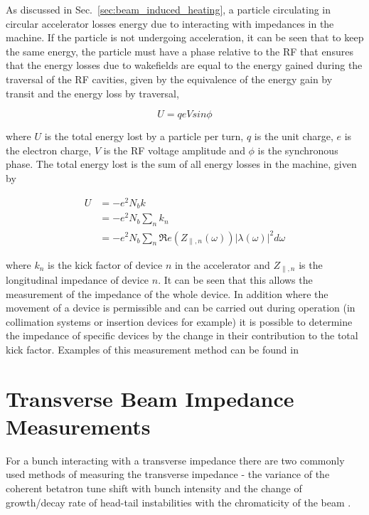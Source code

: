 As discussed in Sec.~\ref{sec:beam_induced_heating}, a particle circulating in circular accelerator losses energy due to interacting with impedances in the machine. If the particle is not undergoing acceleration, it can be seen that to keep the same energy, the particle must have a phase relative to the RF that ensures that the energy losses due to wakefields are equal to the energy gained during the traversal of the RF cavities, given by the equivalence of the energy gain by transit and the energy loss by traversal,

\begin{equation}
U = qeVsin\phi
\end{equation}

where $U$ is the total energy lost by a particle per turn, $q$ is the unit charge, $e$ is the electron charge, $V$ is the RF voltage amplitude and $\phi$ is the synchronous phase. The total energy lost is the sum of all energy losses in the machine, given by

\begin{align}
U & = -e^{2}N_{b}k \\
   & = -e^{2}N_{b}\displaystyle\sum\limits_{n} k_{n} \\
   & = -e^{2}N_{b}\displaystyle\sum\limits_{n} \Re{}e\left( Z_{\parallel,n}\left( \omega \right) \right)\left| \lambda \left( \omega \right) \right|^{2} d\omega
\end{align}

where $k_{n}$ is the kick factor of device $n$ in the accelerator and $ Z_{\parallel,n}$ is the longitudinal impedance of device $n$. It can be seen that this allows the measurement of the impedance of the whole device. In addition where the movement of a device is permissible and can be carried out during operation (in collimation systems or insertion devices for example) it is possible to determine the impedance of specific devices by the change in their contribution to the total kick factor. Examples of this measurement method can be found in \cite{Bohl:SingleBunchEnLoss, Argyropoulos:longImpInj}

\section{Transverse Beam Impedance Measurements}


For a bunch interacting with a transverse impedance there are two commonly used methods of measuring the transverse impedance - the variance of the coherent betatron tune shift with bunch intensity and the change of growth/decay rate of head-tail instabilities with the chromaticity of the beam \cite{Sacherer:BunchBeamEffects}.

